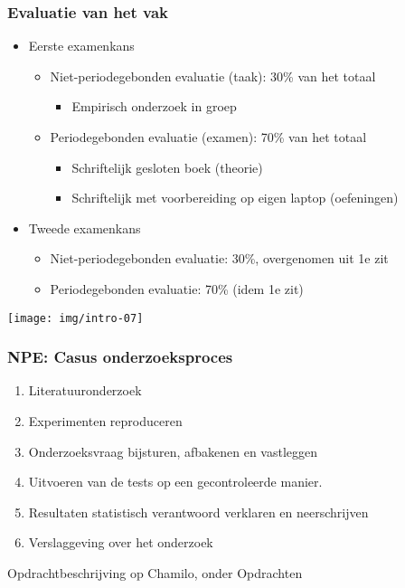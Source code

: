 \documentclass[aspectratio=169]{beamer}
\begin{document}
\begin{frame}
  \frametitle{Evaluatie van het vak}

  \begin{itemize}
    \item Eerste examenkans
      \begin{itemize}
        \item Niet-periodegebonden evaluatie (taak): 30\% van het totaal
          \begin{itemize}
            \item Empirisch onderzoek in groep
          \end{itemize}
        \item Periodegebonden evaluatie (examen): 70\% van het totaal
        \begin{itemize}
          \item Schriftelijk gesloten boek (theorie)
          \item Schriftelijk met voorbereiding op eigen laptop (oefeningen)
        \end{itemize}
      \end{itemize}
    \item Tweede examenkans
      \begin{itemize}
        \item Niet-periodegebonden evaluatie: 30\%, overgenomen uit 1e zit
        \item Periodegebonden evaluatie: 70\% (idem 1e zit)
      \end{itemize}
  \end{itemize}

  \begin{center}
    \texttt{[image: img/intro-07]}
  \end{center}
\end{frame}

\begin{frame}
  \frametitle{NPE: Casus onderzoeksproces}


  \begin{enumerate}
    \item Literatuuronderzoek
    \item Experimenten reproduceren
    \item Onderzoeksvraag bijsturen, afbakenen en vastleggen
    \item Uitvoeren van de tests op een gecontroleerde manier.
    \item Resultaten statistisch verantwoord verklaren en neerschrijven
    \item Verslaggeving over het onderzoek
  \end{enumerate}

  Opdrachtbeschrijving op Chamilo, onder Opdrachten
\end{frame}

\end{document}

